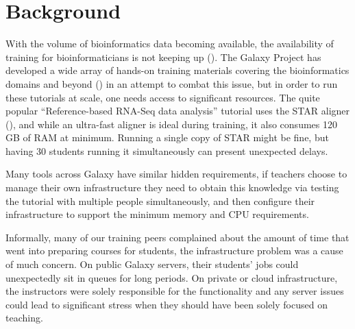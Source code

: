\documentclass[a4paper,num-refs]{oup-contemporary}
\begin{document}
\section{Background}
\label{sec:background}


With the volume of bioinformatics data becoming available, the availability of training for bioinformaticians is not keeping up (\cite{Attwood2017}). The Galaxy Project has developed a wide array of hands-on training materials covering the bioinformatics domains and beyond (\cite{gtn}) in an attempt to combat this issue, but in order to run these tutorials at scale, one needs access to significant resources. The quite popular ``Reference-based RNA-Seq data analysis'' tutorial uses the STAR aligner (\cite{Dobin2012}), and while an ultra-fast aligner is ideal during training, it also consumes 120 GB of RAM at minimum. Running a single copy of STAR might be fine, but having 30 students running it simultaneously can present unexpected delays.

Many tools across Galaxy have similar hidden requirements, if teachers choose to manage their own infrastructure they need to obtain this knowledge via testing the tutorial with multiple people simultaneously, and then configure their infrastructure to support the minimum memory and CPU requirements.

Informally, many of our training peers complained about the amount of time that went into preparing courses for students, the infrastructure problem was a cause of much concern. On public Galaxy servers, their students' jobs could unexpectedly sit in queues for long periods. On private or cloud infrastructure, the instructors were solely responsible for the functionality and any server issues could lead to significant stress when they should have been solely focused on teaching.
\end{document}
